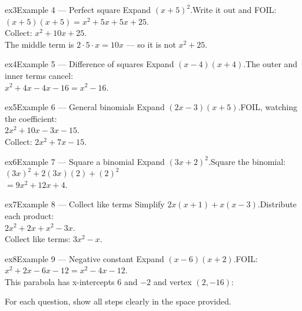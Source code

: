 \documentclass[11pt]{article}
\begin{document}
\begin{example}{ex3}{Example 4 --- Perfect square}
Expand $(x+5)^2$.\soln Write it out and FOIL: \\ $(x+5)(x+5)=x^2+5x+5x+25$. \\ Collect: $x^2+10x+25$. \\ The middle term is $2\cdot5\cdot x=10x$ — so it is not $x^2+25$.
\end{example}

\begin{example}{ex4}{Example 5 --- Difference of squares}
Expand $(x-4)(x+4)$.\soln The outer and inner terms cancel: \\ $x^2+4x-4x-16=x^2-16$.
\end{example}

\begin{example}{ex5}{Example 6 --- General binomials}
Expand $(2x-3)(x+5)$.\soln FOIL, watching the coefficient: \\ $2x^2+10x-3x-15$. \\ Collect: $2x^2+7x-15$.
\end{example}

\begin{example}{ex6}{Example 7 --- Square a binomial}
Expand $(3x+2)^2$.\soln Square the binomial: \\ $(3x)^2+2(3x)(2)+(2)^2$ \\ $=9x^2+12x+4$.
\end{example}

\begin{example}{ex7}{Example 8 --- Collect like terms}
Simplify $2x(x+1)+x(x-3)$.\soln Distribute each product: \\ $2x^2+2x+x^2-3x$. \\ Collect like terms: $3x^2-x$.
\end{example}

\begin{example}{ex8}{Example 9 --- Negative constant}
Expand $(x-6)(x+2)$.\soln FOIL: \\ $x^2+2x-6x-12=x^2-4x-12$. \\ This parabola has x-intercepts $6$ and $-2$ and vertex $(2,-16)$:
\end{example}

\clearpage
{}
For each question, show all steps clearly in the space provided.
\end{document}
